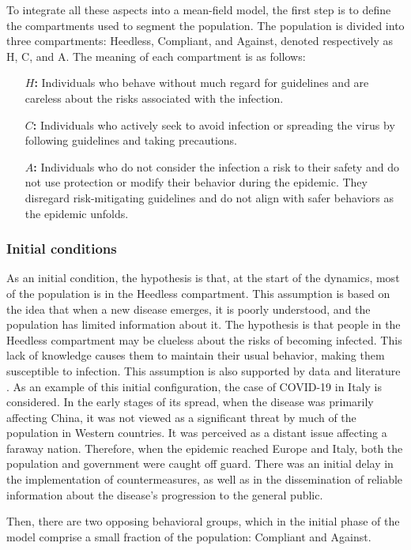 To integrate all these aspects into a mean-field model, the first step is to define the compartments used to segment the population. The population is divided into three compartments: Heedless, Compliant, and Against, denoted respectively as H, C, and A. The meaning of each compartment is as follows:
\begin{itemize}
	\item[\textbf{$H$:}] Individuals who behave without much regard for guidelines and are careless about the risks associated with the infection.
	\item[\textbf{$C$:}] Individuals who actively seek to avoid infection or spreading the virus by following guidelines and taking precautions.
	\item[\textbf{$A$:}]Individuals who do not consider the infection a risk to their safety and do not use protection or modify their behavior during the epidemic. They disregard risk-mitigating guidelines and do not align with safer behaviors as the epidemic unfolds.
\end{itemize}

\subsubsection{Initial conditions}
As an initial condition, the hypothesis is that, at the start of the dynamics, most of the population is in the Heedless compartment. This assumption is based on the idea that when a new disease emerges, it is poorly understood, and the population has limited information about it. The hypothesis is that people in the Heedless compartment may be clueless about the risks of becoming infected. This lack of knowledge causes them to maintain their usual behavior, making them susceptible to infection. This assumption is also supported by data and literature \cite{Usher_2020}. As an example of this initial configuration, the case of COVID-19 in Italy is considered. In the early stages of its spread, when the disease was primarily affecting China, it was not viewed as a significant threat by much of the population in Western countries. It was perceived as a distant issue affecting a faraway nation. Therefore, when the epidemic reached Europe and Italy, both the population and government were caught off guard. There was an initial delay in the implementation of countermeasures, as well as in the dissemination of reliable information about the disease's progression to the general public.

Then, there are two opposing behavioral groups, which in the initial phase of the model comprise a small fraction of the population: Compliant and Against.

